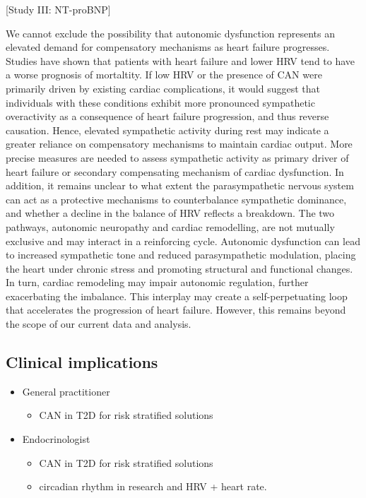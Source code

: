 \documentclass[
  a4paper,
  headsepline=true,
  open=any]{scrbook}
\providecommand{\tightlist}{%
  \setlength{\itemsep}{0pt}\setlength{\parskip}{0pt}}\usepackage{longtable,booktabs,array}
\begin{document}
{[}Study III: NT-proBNP{]}

We cannot exclude the possibility that autonomic dysfunction represents
an elevated demand for compensatory mechanisms as heart failure
progresses. Studies have shown that patients with heart failure and
lower HRV tend to have a worse prognosis of mortaltity. If low HRV or
the presence of CAN were primarily driven by existing cardiac
complications, it would suggest that individuals with these conditions
exhibit more pronounced sympathetic overactivity as a consequence of
heart failure progression, and thus reverse causation. Hence, elevated
sympathetic activity during rest may indicate a greater reliance on
compensatory mechanisms to maintain cardiac output. More precise
measures are needed to assess sympathetic activity as primary driver of
heart failure or secondary compensating mechanism of cardiac
dysfunction. In addition, it remains unclear to what extent the
parasympathetic nervous system can act as a protective mechanisms to
counterbalance sympathetic dominance, and whether a decline in the
balance of HRV reflects a breakdown. The two pathways, autonomic
neuropathy and cardiac remodelling, are not mutually exclusive and may
interact in a reinforcing cycle. Autonomic dysfunction can lead to
increased sympathetic tone and reduced parasympathetic modulation,
placing the heart under chronic stress and promoting structural and
functional changes. In turn, cardiac remodeling may impair autonomic
regulation, further exacerbating the imbalance. This interplay may
create a self-perpetuating loop that accelerates the progression of
heart failure. However, this remains beyond the scope of our current
data and analysis.

\hypertarget{clinical-implications}{%
\subsection{Clinical implications}\label{clinical-implications}}

\begin{itemize}
\tightlist
\item
  General practitioner

  \begin{itemize}
  \tightlist
  \item
    CAN in T2D for risk stratified solutions
  \end{itemize}
\item
  Endocrinologist

  \begin{itemize}
  \tightlist
  \item
    CAN in T2D for risk stratified solutions
  \item
    circadian rhythm in research and HRV + heart rate.
  \end{itemize}
\end{itemize}
\end{document}
